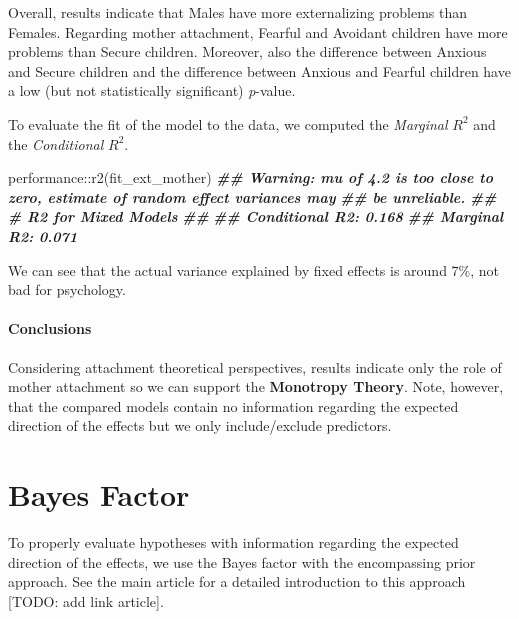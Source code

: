 \documentclass[
]{book}
\newenvironment{Shaded}{\begin{snugshade}}{\end{snugshade}}
\newcommand{\DocumentationTok}[1]{\textcolor[rgb]{0.56,0.35,0.01}{\textbf{\textit{#1}}}}
\newcommand{\FunctionTok}[1]{\textcolor[rgb]{0.00,0.00,0.00}{#1}}
\newcommand{\NormalTok}[1]{#1}
\newcommand{\SpecialCharTok}[1]{\textcolor[rgb]{0.00,0.00,0.00}{#1}}
\begin{document}
Overall, results indicate that Males have more externalizing problems than Females. Regarding mother attachment, Fearful and Avoidant children have more problems than Secure children. Moreover, also the difference between Anxious and Secure children and the difference between Anxious and Fearful children have a low (but not statistically significant) \emph{p}-value.

To evaluate the fit of the model to the data, we computed the \emph{Marginal} \(R^2\) and the \emph{Conditional} \(R^2\).

\begin{Shaded}
\begin{Highlighting}[]
\NormalTok{performance}\SpecialCharTok{::}\FunctionTok{r2}\NormalTok{(fit\_ext\_mother)}
\DocumentationTok{\#\# Warning: mu of 4.2 is too close to zero, estimate of random effect variances may}
\DocumentationTok{\#\#   be unreliable.}
\DocumentationTok{\#\# \# R2 for Mixed Models}
\DocumentationTok{\#\# }
\DocumentationTok{\#\#   Conditional R2: 0.168}
\DocumentationTok{\#\#      Marginal R2: 0.071}
\end{Highlighting}
\end{Shaded}

We can see that the actual variance explained by fixed effects is around 7\%, not bad for psychology.

\hypertarget{conclusions-1}{%
\subsubsection*{Conclusions}\label{conclusions-1}}

Considering attachment theoretical perspectives, results indicate only the role of mother attachment so we can support the \textbf{Monotropy Theory}. Note, however, that the compared models contain no information regarding the expected direction of the effects but we only include/exclude predictors.

\hypertarget{BF-ext}{%
\chapter{Bayes Factor}\label{BF-ext}}

To properly evaluate hypotheses with information regarding the expected direction of the effects, we use the Bayes factor with the encompassing prior approach. See the main article for a detailed introduction to this approach {[}TODO: add link article{]}.
\end{document}
